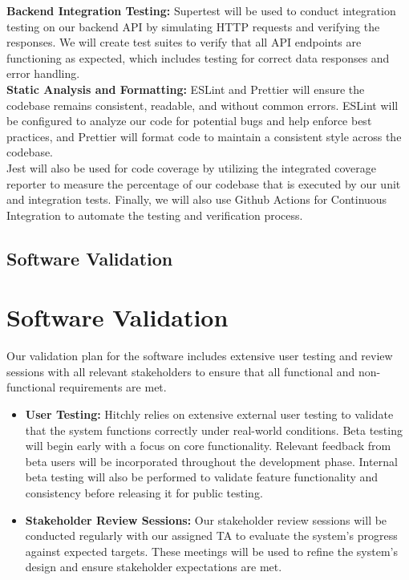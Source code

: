 \documentclass[12pt, titlepage]{article}
\begin{document}
\noindent \textbf{Backend Integration Testing:} Supertest will be used to conduct integration testing on our backend API by simulating HTTP requests and verifying the responses. We will create test suites to verify that all API endpoints are functioning as expected, which includes testing for correct data responses and error handling. \\

\noindent \textbf{Static Analysis and Formatting:} ESLint and Prettier will ensure the codebase remains consistent, readable, and without common errors. ESLint will be configured to analyze our code for potential bugs and help enforce best practices, and Prettier will format code to maintain a consistent style across the codebase. \\

\noindent Jest will also be used for code coverage by utilizing the integrated coverage reporter to measure the percentage of our codebase that is executed by our unit and integration tests. Finally, we will also use Github Actions for Continuous Integration to automate the testing and verification process. \\

\subsection{Software Validation}

\section{Software Validation}

Our validation plan for the software includes extensive user testing and review sessions with all relevant stakeholders to ensure that all functional and non-functional requirements are met.

\begin{itemize}
    \item \textbf{User Testing:} 
    Hitchly relies on extensive external user testing to validate that the system functions correctly under real-world conditions. 
    Beta testing will begin early with a focus on core functionality. 
    Relevant feedback from beta users will be incorporated throughout the development phase. 
    Internal beta testing will also be performed to validate feature functionality and consistency before releasing it for public testing.

    \item \textbf{Stakeholder Review Sessions:} 
    Our stakeholder review sessions will be conducted regularly with our assigned TA to evaluate the system's progress against expected targets. 
    These meetings will be used to refine the system’s design and ensure stakeholder expectations are met.
\end{itemize}
\end{document}
